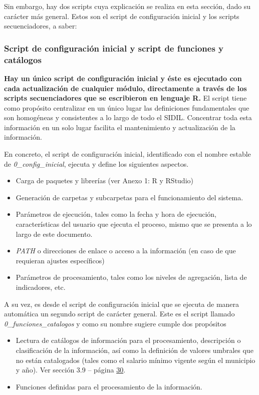 \documentclass[
]{article}
\begin{document}
Sin embargo, hay dos scripts cuya explicación se realiza en esta sección, dado su carácter más general. Estos son el script de configuración inicial y los scripts secuenciadores, a saber:

\hypertarget{configinicial}{%
\subsubsection{Script de configuración inicial y script de funciones y catálogos}\label{configinicial}}

\textbf{Hay un único script de configuración inicial y éste es ejecutado con cada actualización de cualquier módulo, directamente a través de los scripts secuenciadores que se escribieron en lenguaje R.} El script tiene como propósito centralizar en un único lugar las definiciones fundamentales que son homogéneas y consistentes a lo largo de todo el SIDIL. Concentrar toda esta información en un solo lugar facilita el mantenimiento y actualización de la información.

En concreto, el script de configuración inicial, identificado con el nombre estable de \emph{0\_config\_inicial}, ejecuta y define los siguientes aspectos.

\begin{itemize}
\item
  Carga de paquetes y librerías (ver Anexo 1: R y RStudio)
\item
  Generación de carpetas y subcarpetas para el funcionamiento del sistema.
\item
  Parámetros de ejecución, tales como la fecha y hora de ejecución, características del usuario que ejecuta el proceso, mismo que se presenta a lo largo de este documento.
\item
  \emph{PATH} o direcciones de enlace o acceso a la información (en caso de que requieran ajustes específicos)
\item
  Parámetros de procesamiento, tales como los niveles de agregación, lista de indicadores, etc.
\end{itemize}

A su vez, es desde el script de configuración inicial que se ejecuta de manera automática un segundo script de carácter general. Este es el script llamado \emph{0\_funciones\_catalogos} y como su nombre sugiere cumple dos propósitos

\begin{itemize}
\item
  Lectura de catálogos de información para el procesamiento, descripción o clasificación de la información, así como la definición de valores umbrales que no están catalogados (tales como el salario mínimo vigente según el municipio y año). Ver sección 3.9 -- página \protect\hyperlink{catuxe1logos-de-informaciuxf3n}{30}.
\item
  Funciones definidas para el procesamiento de la información.
\end{itemize}
\end{document}
